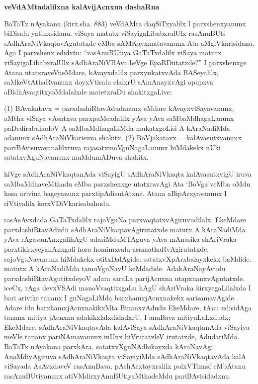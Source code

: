 \bigskip
\begin{center}
{\Large\bf veVdAMtadalilxna kalAvijAcnxna dashaRna}
\end{center}

BaTaTx nAyakanu (kirx.sha. 883) veVdAMta daqSiTxyalilx I parxshenxyanunx biDisalu yatinxsidanu. viSaya matutx viSayigaLibabxralUlx rasAnuBUti sAdhAraNiVkaqtavAgutatxde eMba sAMKayxmatavanunx Ata aMgiVkarisidanu. Aga I parxshenx edidxtu: ``rasAnuBUtiya GaTaTxdalilx viSaya matutx viSayigaLibabxralUlx sAdhAraNiVBAva heVge EpaRDutatxde?'' I parxshenxge Atana utatxraveVneMdare, kAvayxdalilx parxyukatxvAda BASeyalilx, saMkeVtAthaRvanunx doyxVtisalu elalxrU sAmAnayxvAgi opupxva aBidhAvaqtitxyoMdalalxde matetxraDu shakitx\-gaLive:

(1) BAvakatavx = parxdashiRtavAdudanunx eMdare kAvayxviSayavanunx, aMtha viSaya vAsatxva parxpaMcadalilx yAva yAva saMbaMdhagaLanunx paDedirabahudoV A saMbaMdhagaLiMda mukatxgoLisi A kAraNadiMda adanunx sAdhAraNiVkarisuva shakitx. (2) BoVjakatavx = kalAvasutxvanunx pariBAvisuvavanalilxruva rajasatxmoVguNagaLanunx hiMdakekx nUki satatxvXguNavanunx muMdumADuva shakitx.

hiVge sAdhAraNiVkaqtanAda viSayigU sAdhAraNiVkaqta kalAvasutxvigU iruva saMbaMdhaveMthadu eMba parxshenxge utatxravAgi Ata `BoVga'veMba oMdu hosa arivina bageyanunx parxtipAdisutAtxne. Atana aBipArxyavanunx I riVtiyalilx korxVDiVkarisabahudu.

rasAsAvxdada GaTaTxdalilx rajoVguNa parxvaqtatxvAgiruvudilalx, EkeMdare parxdashiRta\break\-vAdudu sAdhAraNiVkaqtavAgirutatxde matutx A kAraNadiMda yAva rAgavanAnxgali\break hAgU adariMduMTAguva yAva mAnasika-shAriVraka parxtikirxyeyanAnxgali hora homimxsalu asamathaRvAgirutatxde. rajoVguNavanunx hiMdakekx otitxDalAgide. satatxvX\break pArxbalayxkekx baMdide. matutx A kAraNadiMda tamoVguNavU keMdadide. AdakAraNa\break yAvudu parxdashiRtavAgutitxdeyoV adara saraLa parijAcnxna utapxnanxvAgutatxde. iceCx, rAga devxVSAdi manoVvaqtitxgaLu hAgU shAriVraka kirxyegaLilalxda I bari arivike tananx I guNagaLiMda barxhamxjAcnxnakekx sarisamavAgide. Adare idu barxhamxjAcnxnakikxMta BinanxvAdudu EkeMdare, tAnu udisidAga tananx mitiya jAcnxna adakikxlalxdidadxrU, I anuBava miti\-yuLaLxdudx; EkeMdare, sAdhAraNiVkaqtavAda kalAviSaya sAdhAraNiVkaqtanAda viSayiya meVle tananx pariNAmavanunx inUnx biVrutatxleV irutatxde, AdudariMda. BaTaTx nAyakana parxkAra, satatxvXguNAdhikayxda kAraNavAgi AnaMdiyAgiruva sAdhAraNiVkaqta viSayi\-yiMda sAdhAraNiVkaqtavAda kalA viSayada AsAvxdaveV rasAnuBava. pAshAcxtayxralilx polxVTinasf eMbAtanu rasAnuBUtiyanunx atiVMdirxyAnuBUtiyaMthadeMdu pariBAvisidadxnu.

